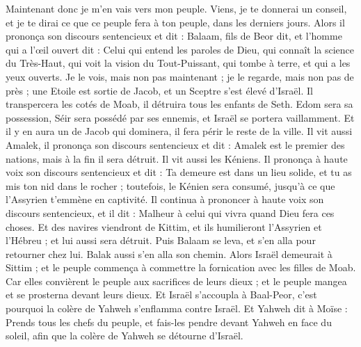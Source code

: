 \begin{multicols}{2}
Maintenant donc je m'en vais vers mon peuple. Viens, je te donnerai un conseil, et je te dirai ce que ce peuple fera à ton peuple, dans les derniers jours.
Alors il prononça son discours sentencieux et dit : Balaam, fils de Beor dit, et l'homme qui a l'œil ouvert dit :
Celui qui entend les paroles de Dieu, qui connaît la science du Très-Haut, qui voit la vision du Tout-Puissant, qui tombe à terre, et qui a les yeux ouverts.
Je le vois, mais non pas maintenant ; je le regarde, mais non pas de près ; une Etoile est sortie de Jacob, et un Sceptre s'est élevé d'Israël. Il transpercera les cotés de Moab, il détruira tous les enfants de Seth.
Edom sera sa possession, Séir sera possédé par ses ennemis, et Israël se portera vaillamment.
Et il y en aura un de Jacob qui dominera, il fera périr le reste de la ville.
Il vit aussi Amalek, il prononça son discours sentencieux et dit : Amalek est le premier des nations, mais à la fin il sera détruit.
Il vit aussi les Kéniens. Il prononça à haute voix son discours sentencieux et dit : Ta demeure est dans un lieu solide, et tu as mis ton nid dans le rocher ;
toutefois, le Kénien sera consumé, jusqu'à ce que l'Assyrien t'emmène en captivité.
Il continua à prononcer à haute voix son discours sentencieux, et il dit : Malheur à celui qui vivra quand Dieu fera ces choses.
Et des navires viendront de Kittim, et ils humilieront l'Assyrien et l'Hébreu ; et lui aussi sera détruit.
Puis Balaam se leva, et s'en alla pour retourner chez lui. Balak aussi s'en alla son chemin.
\VerseOne{}Alors Israël demeurait à Sittim ; et le peuple commença à commettre la fornication avec les filles de Moab.
Car elles convièrent le peuple aux sacrifices de leurs dieux ; et le peuple mangea et se prosterna devant leurs dieux.
Et Israël s'accoupla à Baal-Peor, c'est pourquoi la colère de Yahweh s'enflamma contre Israël.
Et Yahweh dit à Moïse : Prends tous les chefs du peuple, et fais-les pendre devant Yahweh en face du soleil, afin que la colère de Yahweh se détourne d'Israël.

\end{multicols}
